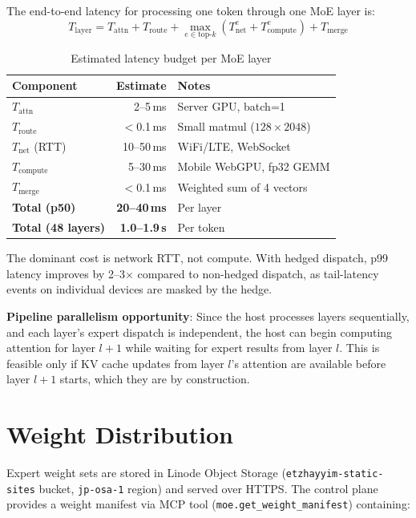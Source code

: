 \documentclass[11pt,a4paper]{article}
\begin{document}
The end-to-end latency for processing one token through one MoE layer
is:
\begin{equation}
  T_{\text{layer}} = T_{\text{attn}} + T_{\text{route}} +
    \max_{e \in \text{top-}k}
    \left(T_{\text{net}}^e + T_{\text{compute}}^e\right) +
    T_{\text{merge}}
  \label{eq:latency}
\end{equation}

\begin{table}[h]
\centering
\caption{Estimated latency budget per MoE layer}
\label{tab:latency}
\begin{tabular}{@{}lrl@{}}
\toprule
Component & Estimate & Notes \\
\midrule
$T_{\text{attn}}$ & 2--5\,ms & Server GPU, batch=1 \\
$T_{\text{route}}$ & $<$0.1\,ms & Small matmul ($128 \times 2048$) \\
$T_{\text{net}}$ (RTT) & 10--50\,ms & WiFi/LTE, WebSocket \\
$T_{\text{compute}}$ & 5--30\,ms & Mobile WebGPU, fp32 GEMM \\
$T_{\text{merge}}$ & $<$0.1\,ms & Weighted sum of 4 vectors \\
\midrule
\textbf{Total (p50)} & \textbf{20--40\,ms} & Per layer \\
\textbf{Total (48 layers)} & \textbf{1.0--1.9\,s} & Per token \\
\bottomrule
\end{tabular}
\end{table}

The dominant cost is network RTT, not compute. With hedged dispatch,
p99 latency improves by 2--3$\times$ compared to non-hedged dispatch,
as tail-latency events on individual devices are masked by the hedge.

\textbf{Pipeline parallelism opportunity}: Since the host processes
layers sequentially, and each layer's expert dispatch is independent,
the host can begin computing attention for layer $l+1$ while waiting
for expert results from layer $l$. This is feasible only if KV cache
updates from layer $l$'s attention are available before layer $l+1$
starts, which they are by construction.

\section{Weight Distribution}
\label{sec:weights}

Expert weight sets are stored in Linode Object Storage
(\texttt{etzhayyim-static-sites} bucket, \texttt{jp-osa-1} region) and
served over HTTPS. The control plane provides a weight manifest via
MCP tool (\texttt{moe.get\_weight\_manifest}) containing:
\end{document}
